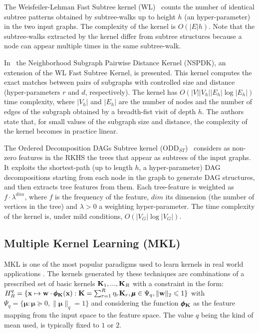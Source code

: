 \documentclass{esannV2}
\newcommand{\xx}{{\bf x}}
\newcommand{\KK}{{\bf K}}
\newcommand{\1}{{\bf 1}}
\newcommand{\mmu}{\pmb{\mu}}
\newcommand{\pphi}{\pmb{\phi}}
\begin{document}
The Weisfeiler-Lehman Fast Subtree kernel (WL)~\cite{NIPS2009_0533}  counts the number of identical subtree patterns obtained by subtree-walks up to height $h$ (an hyper-parameter) in the two input graphs. The complexity of the kernel is $O(|E|h)$. 
Note that the subtree-walks extracted by the kernel differ from  subtree structures because a node can appear multiple times in the same subtree-walk.

In~\cite{Costa2010} the Neighborhood Subgraph Pairwise Distance Kernel (NSPDK), an extension of the WL Fast Subtree Kernel, is presented. This kernel computes the exact matches between pairs of subgraphs with controlled size and distance (hyper-parameters $r$ and $d$, respectively). 
The kernel has $O(|V| |V_h| |E_h| \log |E_h|)$ time complexity, where $|V_h|$ and $|E_h|$ are the number of nodes and the number of edges of the subgraph obtained by a breadth-fist visit of depth $h$. 
The authors state that, for small values of the subgraph size and distance, the complexity of the kernel becomes in practice linear.

The Ordered Decomposition DAGs Subtree kernel (ODD$_{ST}$)~\cite{Dasan2012,DaSanMartino2016} considers as non-zero features in the RKHS the trees that appear as subtrees of the input graphs.
It exploits the shortest-path (up to length $h$, a hyper-parameter) DAG decompositions starting from each node in the graph to generate DAG structures, and then extracts tree features from them.
Each tree-feature is weighted as $f \cdot \lambda^{dim}$, where $f$ is the frequency of the feature, $dim$ its dimension (the number of vertices in the tree) and $\lambda>0$ a weighting hyper-parameter.
The time complexity of the kernel is, under mild conditions, $O(|V_G| \log |V_G|)$.%

\subsection{Multiple Kernel Learning (MKL)}
\label{MKL}
MKL \cite{Bach2004,Gonen2011} is one of the most popular paradigms used to learn kernels in real world applications \cite{Bucak2014,Castro2014}. %
The kernels generated by these techniques are combinations of a prescribed set of basic kernels $\KK_1,...,\KK_R$ with a constraint in the form:
$
	H_R^q = \{ \xx \mapsto \textbf{w} \cdot \pphi_\KK(\xx) : \KK = \sum_{r=1}^R \eta_r \KK_r, \mmu \in \Psi_q, \|\textbf{w}\|_2 \leqslant 1 \}
$
with $\Psi_q = \{ \mmu : \mmu \succcurlyeq 0, \| \mmu \|_q = 1 \}$ and considering the function $\pphi_\KK$ as the feature mapping from the input space to the feature space. The value $q$ being the kind of mean used, is typically fixed to $1$ or $2$.
\end{document}
